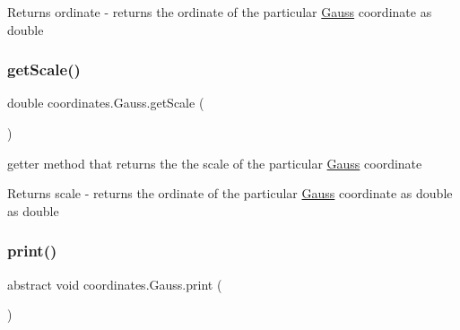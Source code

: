 \begin{DoxyReturn}{Returns}
ordinate -\/ returns the ordinate of the particular \hyperlink{classcoordinates_1_1_gauss}{Gauss} coordinate as double 
\end{DoxyReturn}
\mbox{\label{classcoordinates_1_1_gauss_ab0d10005ccb914af91c8afc28d2ed836}} 
\subsubsection{\texorpdfstring{get\+Scale()}{getScale()}}
{\footnotesize\ttfamily double coordinates.\+Gauss.\+get\+Scale (\begin{DoxyParamCaption}{ }\end{DoxyParamCaption})}



getter method that returns the the scale of the particular \hyperlink{classcoordinates_1_1_gauss}{Gauss} coordinate 

\begin{DoxyReturn}{Returns}
scale -\/ returns the ordinate of the particular \hyperlink{classcoordinates_1_1_gauss}{Gauss} coordinate as double as double 
\end{DoxyReturn}
\mbox{\label{classcoordinates_1_1_gauss_aa088aa6fb796aa873b19ee2c1ef42468}} 
\subsubsection{\texorpdfstring{print()}{print()}}
{\footnotesize\ttfamily abstract void coordinates.\+Gauss.\+print (\begin{DoxyParamCaption}{ }\end{DoxyParamCaption})\hspace{0.3cm}{\ttfamily [abstract]}}

\mbox{\label{classcoordinates_1_1_gauss_a82bc0ee0a9fae9bef4e3400615d50c58}} 
